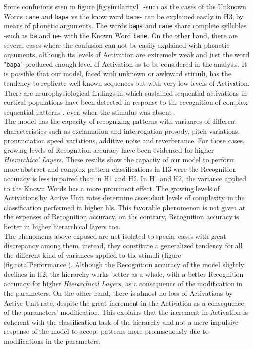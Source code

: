 \documentclass[11pt,a4paper]{article}
\begin{document}
Some confusions seen in figure \ref{fig:similarity1}
-such as the cases of the Unknown Words \texttt{cane} and
\texttt{bapa} vs the know word \texttt{bane}-
can be explained easily in H3, by means of phonetic
arguments.
The words \texttt{bapa} and \texttt{cane} share complete
syllables -such as \texttt{ba} and \texttt{ne}-
with the Known Word \texttt{bane}.
On the other hand, there are several cases where the
confusion can not be easily explained with phonetic arguments,
although its levels of Activation are extremely weak and
just the word "\texttt{bapa}" produced enough level of
Activation as to be considered in the analysis.
It is possible that our model, faced with unknown or awkward
stimuli, has the tendency to replicate well known sequences
but with very low levels of Activation.
There are neurophysiological findings in which sustained
sequential activations in cortical populations have been
detected in response to the recognition of complex
sequential patterns \cite{carrillo15}, even when the
stimulus was absent \cite{gavornic14}.\\

The model has the capacity of recognizing patterns
with variances of different characteristics such as
exclamation and interrogation prosody, pitch variations,
pronunciation speed variations, additive noise and
reverberance.
For those cases, growing levels of Recognition accuracy
have been evidenced for higher \textit{Hierarchical Layers}.
These results show the capacity of our model to perform
more abstract and complex pattern classifications in H3
were the Recognition accuracy is less impaired than
in H1 and H2.
In H1 and H2, the variance applied to the Known Words
has a more prominent effect.
The growing levels of Activations by Active Unit rates
determine ascendant levels of complexity in the
classification performed in higher \ac{hl}s.
This favorable phenomenon is not given at the expenses
of Recognition accuracy, on the contrary,
Recognition accuracy is better in higher hierarchical
layers too.\\

The phenomena above exposed are not
isolated to special cases with great discrepancy among them,
instead, they constitute a generalized tendency for all the different kind
of variances applied to the stimuli (figure \ref{fig:totalPerformance}).
Although the Recognition accuracy of the model slightly declines in H2,
the hierarchy works better as a whole, with a better Recognition accuracy for higher
\textit{Hierarchical Layers}, as a consequence of the modification in the parameters.
On the other hand, there is almost no loss of Activations by Active Unit rate,
despite the great increment in the Activation as a consequence of the parameters' modification.
This explains that the increment in Activation is coherent with the classification task of the hierarchy
and not a mere impulsive response of the model to accept patterns more promiscuously due to
modifications in the parameters.\\
\end{document}
